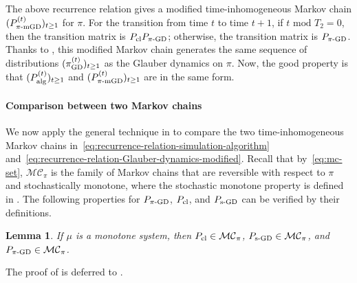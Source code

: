 \documentclass[11pt,a4paper]{article}
\newcommand{\psim}{P_{\textnormal{s-GD}}}
\newtheorem{lemma}[theorem]{Lemma}
\theoremstyle{definition}
\def\+#1{\mathcal{#1}} %
\begin{document}
The above recurrence relation gives a modified time-inhomogeneous Markov chain $(P_{\pi\textnormal{-mGD}}^{(t)})_{t \geq 1}$ for $\pi$. For the transition from time $t$ to time $t+1$, if $t \text{ mod } T_2 = 0$, then the transition matrix is $P_{\textnormal{cl}} P_{\pi\textnormal{-GD}}$; otherwise, the transition matrix is $P_{\pi\textnormal{-GD}}$. 
Thanks to , this modified Markov chain generates the same sequence of distributions $(\pi^{(t)}_{\textnormal{GD}})_{t \geq 1}$ as the Glauber dynamics on $\pi$. Now, the good property is that $(P_{\textnormal{alg}}^{(t)})_{t \geq 1}$ and $(P_{\pi\textnormal{-mGD}}^{(t)})_{t \geq 1}$ are in the same form.

\paragraph{Comparison between two Markov chains}
We now apply the general technique in  to compare the two time-inhomogeneous Markov chains in~\eqref{eq:recurrence-relation-simulation-algorithm} and~\eqref{eq:recurrence-relation-Glauber-dynamics-modified}. 
Recall that by~\eqref{eq:mc-set}, $\+{MC}_\pi$ is the family of Markov chains that are reversible with respect to $\pi$ and stochastically monotone, where the stochastic monotone property is defined in .
The following properties for $P_{\pi\textnormal{-GD}}$, $P_{\textnormal{cl}}$, and $\psim$ can be verified by their definitions. 
\begin{lemma}\label{lem:properties-of-transition-matrices}
    If $\mu$ is a monotone system, then $P_{\textnormal{cl}} \in \+{MC}_\pi$, $\psim \in \+{MC}_\pi$, and $P_{\pi\textnormal{-GD}} \in \+{MC}_\pi$.
\end{lemma}
The proof of  is deferred to . %
\end{document}

